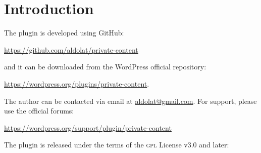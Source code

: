 \documentclass[
	titlepage,
	headinclude,
	abstract=on,
	paper=a4,
	fontsize=11pt,
]{scrartcl}
\begin{document}
\title{\color{CTtitle}\rmfamily\normalfont{}}
\author{}
\date{12 gennaio 2020}

\maketitle

\frenchspacing

\begin{abstract}
\noindent Private Content is a plugin for WordPress
that displays a portion of a post/page content only
to users of a specific role or to a single or multiple users.
This file, written in \LaTeX and \textit{ClassicThesis}, contains
the entire text of the Wiki with some adaptation, available at:
\begin{center}
  \url{https://github.com/aldolat/private-content/wiki}
\end{center}
This document is released under the same terms of the plugin's license.
\end{abstract}

\newpage

\tableofcontents

\listoftables

\newpage

\section{Introduction}

The plugin is developed using GitHub:
\begin{center}
  \url{https://github.com/aldolat/private-content}
\end{center}
and it can be downloaded from the WordPress official repository:
\begin{center}
  \url{https://wordpress.org/plugins/private-content}.
\end{center}

The author can be contacted via email at \url{aldolat@gmail.com}.
For support, please use the official forums:
\begin{center}
  \url{https://wordpress.org/support/plugin/private-content}
\end{center}

The plugin is released under the terms of the \textsc{gpl} License v3.0 and later:
\end{document}

